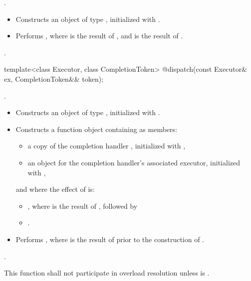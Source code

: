 \begin{itemdescr}
\pnum
\completionsig {}.

\pnum
\effects
\begin{itemize}
\item
 Constructs an object  of type , initialized with .
\item
 Performs , where  is the result of , and  is the result of .
\end{itemize}

\pnum
\returns {}.
\end{itemdescr}

\begin{itemdecl}
template<class Executor, class CompletionToken>
  @\DEDUCED@ dispatch(const Executor& ex, CompletionToken&& token);
\end{itemdecl}

\begin{itemdescr}
\pnum
\completionsig {}.

\pnum
\effects
\begin{itemize}
\item
 Constructs an object  of type , initialized with .
\item
 Constructs a function object  containing as members:
\begin{itemize}
\item
a copy of the completion handler , initialized with ,
\item
an  object  for the completion handler's associated executor, initialized with ,
\end{itemize}
and where the effect of  is:
\begin{itemize}
\item
{}, where  is the result of , followed by
\item
{}.
\end{itemize}
\item
 Performs , where  is the result of  prior to the construction of .
\end{itemize}

\pnum
\returns {}.

\pnum
\remarks This function shall not participate in overload resolution unless
 is .
\end{itemdescr}

